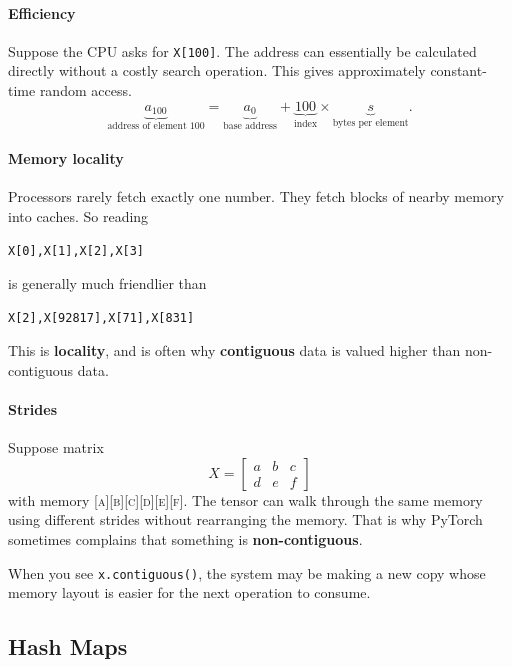 \paragraph{Efficiency}
Suppose the CPU asks for \verb|X[100]|.
The address can essentially be calculated directly without a costly search operation.
This gives approximately constant-time random access.
\[
\underbrace{a_{100}}_{\text{address of element 100}}
=
\underbrace{a_0}_{\text{base address}}
+
\underbrace{100}_{\text{index}}
\times
\underbrace{s}_{\text{bytes per element}}.
\]


\paragraph{Memory locality}

Processors rarely fetch exactly one number.
They fetch blocks of nearby memory into caches.
So reading
\begin{verbatim}
X[0],X[1],X[2],X[3]
\end{verbatim}
is generally much friendlier than
\begin{verbatim}
X[2],X[92817],X[71],X[831]
\end{verbatim}
This is \textbf{locality}, and is often why \textbf{contiguous} data is valued higher than non-contiguous data.

\paragraph{Strides}
Suppose matrix
\[
    X=
    \begin{bmatrix}
    a & b & c\\
    d & e & f
    \end{bmatrix}
\]
with memory \textsc{[a][b][c][d][e][f]}.
The tensor can walk through the same memory using different strides without rearranging the memory.
That is why PyTorch sometimes complains that something is \textbf{non-contiguous}.

\begin{calloutpracticaltip}
    When you see \verb|x.contiguous()|, the system may be making a new copy whose memory layout is easier for the next operation to consume.
\end{calloutpracticaltip}

\subsection{Hash Maps}
\label{subsec:hash-maps}

